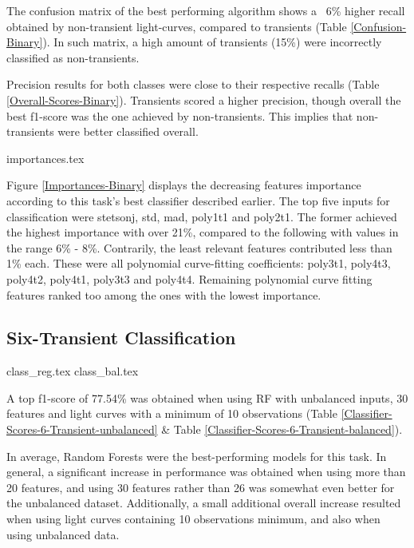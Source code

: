 \documentclass[a4paper,fleqn,usenatbib]{mnras}
\begin{document}
The confusion matrix of the best performing algorithm shows a ~6\% higher recall obtained by non-transient light-curves, compared to transients (Table \ref{Confusion-Binary}). In such matrix, a high amount of transients (15\%) were incorrectly classified as non-transients.

Precision results for both classes were close to their respective recalls (Table \ref{Overall-Scores-Binary}). Transients scored a higher precision, though overall the best f1-score was the one achieved by non-transients. This implies that non-transients were better classified overall.

{importances.tex}

Figure \ref{Importances-Binary} displays the decreasing features importance according to this task's best classifier described earlier. The top five inputs for classification were
stetson\textunderscore j, std, mad, poly1\textunderscore t1 and poly2\textunderscore t1. The former achieved the highest importance with over 21\%, compared to the following with values in the range 6\% - 8\%. Contrarily, the least relevant features contributed less than 1\% each. These were all polynomial curve-fitting coefficients: 
poly3\textunderscore t1, poly4\textunderscore t3, poly4\textunderscore t2, poly4\textunderscore t1, poly3\textunderscore t3 and poly4\textunderscore t4. Remaining polynomial curve fitting features ranked too among the ones with the lowest importance.


\subsection{Six-Transient Classification}

{class_reg.tex}
{class_bal.tex}

A top f1-score of 77.54\% was obtained when using RF with unbalanced inputs, 30 features and light curves with a minimum of 10 observations (Table \ref{Classifier-Scores-6-Transient-unbalanced} \& Table \ref{Classifier-Scores-6-Transient-balanced}).

In average, Random Forests were the best-performing models for this task. In general, a significant increase in performance was obtained when using more than 20 features, and using 30 features rather than 26 was somewhat even better for the unbalanced dataset. Additionally, a small additional overall increase resulted when using light curves containing 10 observations minimum, and also when using unbalanced data.
\end{document}
